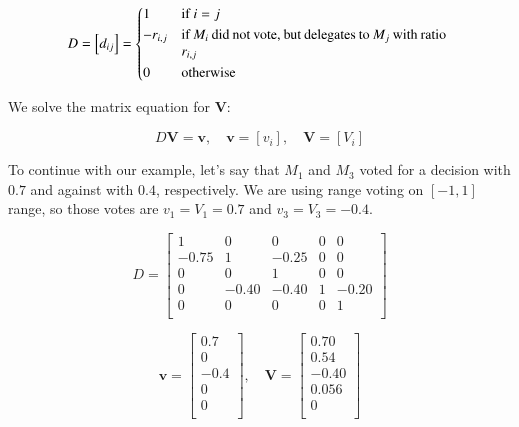 \documentclass{sigchi}
\begin{document}
\begin{displaymath}
D = \left[d_{ij}\right] = \begin{dcases*}
 1 & if $i = j$ \\
 -r_{i,j} & \parbox[t]{.55\columnwidth}{if $M_i$ did not vote, but delegates to $M_j$ with ratio $r_{i,j}$} \\
 0 & otherwise \\
\end{dcases*}
\end{displaymath}

We solve the matrix equation for $\boldsymbol{V}$:

\begin{displaymath}
D \boldsymbol{V} = \boldsymbol{v},\quad \boldsymbol{v} = \left[v_{i}\right],\quad \boldsymbol{V} = \left[V_{i}\right]
\end{displaymath}

To continue with our example, let's say that $M_1$ and $M_3$ voted for a decision with $0.7$ and against with $0.4$,
respectively.
We are using range voting on $[-1, 1]$ range, so those votes are $v_1 = V_1 = 0.7$ and
$v_3 = V_3 = -0.4$.

\begin{displaymath}
D = \left[ \begin{array}{ccccc}
1 & 0 & 0 & 0 & 0 \\
-0.75 & 1 & -0.25 & 0 & 0 \\
0 & 0 & 1 & 0 & 0 \\
0 & -0.40 & -0.40 & 1 & -0.20 \\
0 & 0 & 0 & 0 & 1 \\
\end{array} \right]
\end{displaymath}

\begin{displaymath}
\boldsymbol{v} = \left[ \begin{array}{c}
0.7 \\
0 \\
-0.4 \\
0 \\
0 \\
\end{array} \right],\quad \boldsymbol{V} = \left[ \begin{array}{c}
0.70 \\
0.54 \\
-0.40 \\
0.056 \\
0 \\
\end{array} \right]
\end{displaymath}
\end{document}
